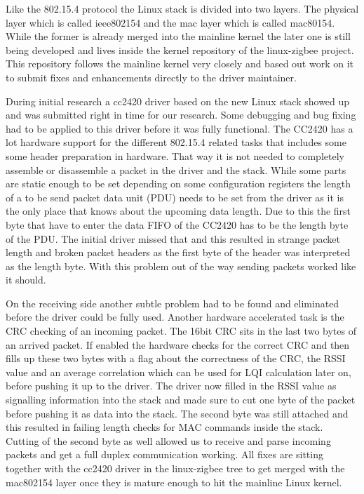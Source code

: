 Like the 802.15.4 protocol the Linux stack is divided into two layers. The
physical layer which is called ieee802154 and the mac layer which is called
mac80154. While the former is already merged into the mainline kernel the later
one is still being developed and lives inside the kernel repository of the
linux-zigbee project. This repository follows the mainline kernel very closely
and based out work on it to submit fixes and enhancements directly to the driver
maintainer.

During initial research a cc2420 driver based on the new Linux stack showed up
and was submitted right in time for our research. Some debugging and bug fixing
had to be applied to this driver before it was fully functional. The CC2420 has
a lot hardware support for the different 802.15.4 related tasks that includes
some some header preparation in hardware. That way it is not needed to
completely assemble or disassemble a packet in the driver and the stack. While
some parts are static enough to be set depending on some configuration registers
the length of a to be send packet data unit (PDU) needs to be set from the driver
as it is the only place that knows about the upcoming data length. Due to this
the first byte that have to enter the data FIFO of the CC2420 has to be the
length byte of the PDU. The initial driver missed that and this resulted in
strange packet length and broken packet headers as the first byte of the header
was interpreted as the length byte. With this problem out of the way sending
packets worked like it should.

On the receiving side another subtle problem had to be found and eliminated
before the driver could be fully used. Another hardware accelerated task is the
CRC checking of an incoming packet. The 16bit CRC sits in the last two bytes of
an arrived packet. If enabled the hardware checks for the correct CRC and
then fills up these two bytes with a flag about the correctness of the CRC, the
RSSI value and an average correlation which can be used for LQI calculation
later on, before pushing it up to the driver. The driver now filled in the RSSI
value as signalling information into the stack and made sure to cut one byte
of the packet before pushing it as data into the stack. The second byte was
still attached and this resulted in failing length checks for MAC commands
inside the stack. Cutting of the second byte as well allowed us to receive
and parse incoming packets and get a full duplex communication working. All
fixes are sitting together with the cc2420 driver in the linux-zigbee tree to
get merged with the mac802154 layer once they is mature enough to hit the
mainline Linux kernel.

